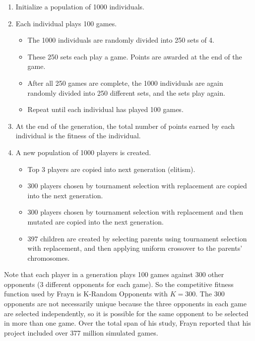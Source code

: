 \begin{enumerate}
  \item Initialize a population of 1000 individuals.
  \item Each individual plays 100 games.
  
  \begin {itemize}
    \item The 1000  individuals are randomly divided into 250 sets of 4.
    \item These 250 sets each play a game. Points are awarded at the end of the
    game.
    \item After all 250 games are complete, the 1000 individuals are again
    randomly divided into 250 different sets, and the sets play again.
    \item Repeat until each individual has played 100 games.
  \end{itemize}
  
  \item At the end of the generation, the total number of points earned by each
  individual is the fitness of the individual.
  \item A new population of 1000 players is created.
  \begin{itemize}
    \item Top 3 players are copied into next generation (elitism).
    \item 300 players chosen by tournament selection with replacement are
    copied into the next generation.
    \item 300 players chosen by tournament selection with replacement and then
    mutated are copied into the next generation.
    \item 397 children are created by selecting parents using tournament
    selection with replacement, and then applying uniform crossover to the 
    parents' chromosomes.
  \end {itemize}
\end{enumerate}

Note that each player in a generation plays 100 games against 300 other
opponents (3 different opponents for each game). So the competitive fitness
function used by Frayn is K-Random Opponents with \(K=300\). The 300 opponents
are not necessarily unique because the three opponents in each game are selected
independently, so it is possible for the same opponent to be selected in more
than one game. Over the total span of his study, Frayn reported that his project
included over 377 million simulated games.

